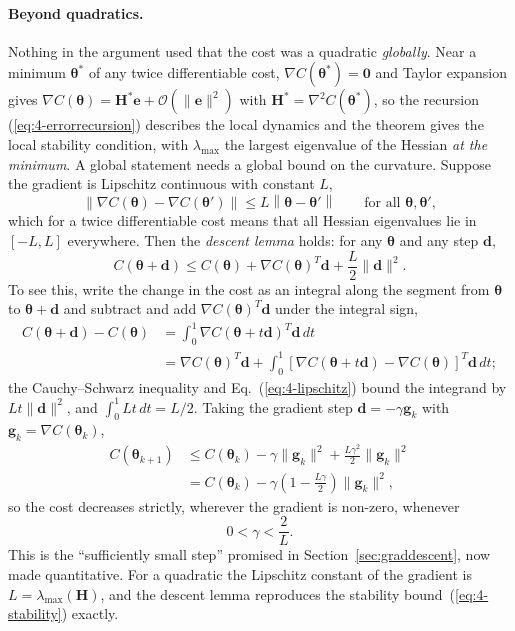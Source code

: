 \paragraph{Beyond quadratics.}
Nothing in the argument used that the cost was a quadratic \emph{globally}.
Near a minimum $\bm{\theta}^{*}$ of any twice differentiable cost,
$\nabla C(\bm{\theta}^{*})=\bm{0}$ and Taylor expansion gives
$\nabla C(\bm{\theta})=\bm{H}^{*}\bm{e}+\mathcal{O}(\|\bm{e}\|^{2})$ with
$\bm{H}^{*}=\nabla^{2}C(\bm{\theta}^{*})$, so the recursion
(\ref{eq:4-errorrecursion}) describes the local dynamics and the theorem
gives the local stability condition, with $\lambda_{\max}$ the largest
eigenvalue of the Hessian \emph{at the minimum}.  A global statement needs a
global bound on the curvature.  Suppose the gradient is Lipschitz continuous
with constant $L$,
\begin{equation}
  \left\|\nabla C(\bm{\theta})-\nabla C(\bm{\theta}')\right\|
   \le L\left\|\bm{\theta}-\bm{\theta}'\right\|
  \qquad\text{for all }\bm{\theta},\bm{\theta}' ,
  \label{eq:4-lipschitz}
\end{equation}
which for a twice differentiable cost means that all Hessian eigenvalues lie
in $[-L,L]$ everywhere.  Then the \emph{descent lemma} holds: for any
$\bm{\theta}$ and any step $\bm{d}$,
\begin{equation}
  C(\bm{\theta}+\bm{d})
   \le C(\bm{\theta})+\nabla C(\bm{\theta})^{T}\bm{d}+\frac{L}{2}\|\bm{d}\|^{2}.
  \label{eq:4-descentlemma}
\end{equation}
To see this, write the change in the cost as an integral along the segment
from $\bm{\theta}$ to $\bm{\theta}+\bm{d}$ and subtract and add
$\nabla C(\bm{\theta})^{T}\bm{d}$ under the integral sign,
\begin{align*}
  C(\bm{\theta}+\bm{d})-C(\bm{\theta})
   &= \int_0^1\nabla C(\bm{\theta}+t\bm{d})^{T}\bm{d}\,dt\\
   &= \nabla C(\bm{\theta})^{T}\bm{d}
     +\int_0^1\left[\nabla C(\bm{\theta}+t\bm{d})-\nabla C(\bm{\theta})\right]^{T}
      \bm{d}\,dt ;
\end{align*}
the Cauchy--Schwarz inequality and Eq.~(\ref{eq:4-lipschitz}) bound the
integrand by $Lt\|\bm{d}\|^{2}$, and $\int_0^1 Lt\,dt=L/2$.  Taking the
gradient step $\bm{d}=-\gamma\bm{g}_k$ with $\bm{g}_k=\nabla C(\bm{\theta}_k)$,
\begin{align}
  C(\bm{\theta}_{k+1})
   &\le C(\bm{\theta}_k)-\gamma\|\bm{g}_k\|^{2}
       +\frac{L\gamma^{2}}{2}\|\bm{g}_k\|^{2}
  \nonumber\\
   &= C(\bm{\theta}_k)-\gamma\left(1-\frac{L\gamma}{2}\right)\|\bm{g}_k\|^{2},
  \label{eq:4-Lbound}
\end{align}
so the cost decreases strictly, wherever the gradient is non-zero, whenever
\begin{equation*}
  0<\gamma<\frac{2}{L}.
\end{equation*}
This is the ``sufficiently small step'' promised in
Section~\ref{sec:graddescent}, now made quantitative.  For a quadratic the
Lipschitz constant of the gradient is $L=\lambda_{\max}(\bm{H})$, and the
descent lemma reproduces the stability bound~(\ref{eq:4-stability}) exactly.

